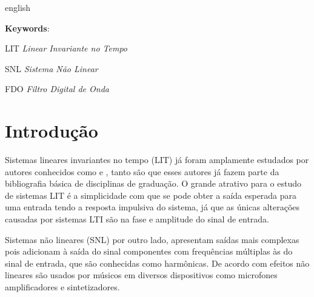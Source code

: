 \begin{resumo}[Abstract]
 \begin{otherlanguage*}{english}
	
   \vspace{\onelineskip}
   \noindent 
   \textbf{Keywords}:
 \end{otherlanguage*}
\end{resumo}


\listoffigures*
\cleardoublepage

\listoftables*
\cleardoublepage

\begin{siglas}
	\item[LIT]		\emph{Linear Invariante no Tempo}
	\item[SNL]		\emph{Sistema Não Linear}
	\item[FDO]		\emph{Filtro Digital de Onda}

\end{siglas}

\tableofcontents*
\cleardoublepage

\textual
	\chapter{Introdução}

Sistemas lineares invariantes no tempo (LIT) já foram amplamente estudados por autores conhecidos como  e  , tanto são que esses autores já fazem parte da bibliografia básica de disciplinas de graduação. O grande atrativo para o estudo de sistemas LIT é a simplicidade com que se pode obter a saída esperada para uma entrada tendo a resposta impulsiva do sistema, já que as únicas alterações causadas por sistemas LTI são na fase e amplitude do sinal de entrada.

Sistemas não lineares (SNL) por outro lado, apresentam saídas mais complexas pois adicionam à saída do sinal componentes com frequências múltiplas às do sinal de entrada, que são conhecidas como harmônicas. De acordo com  efeitos não lineares são usados por músicos em diversos dispositivos como microfones amplificadores e sintetizadores.

